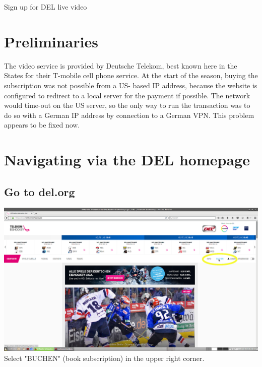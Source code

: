\documentclass[12pt]{article}
\begin{document}
\begin{center}
	\begin{Huge}
		Sign up for DEL live video
	\end{Huge}
\end{center}

\section{Preliminaries}
	The video service is provided by Deutsche Telekom, best known here in the States for their T-mobile
	cell phone service. At the start of the season, buying the subscription was not possible from a US-
	based IP address, because the website is configured to redirect to a local server for the payment
	if possible. The network would time-out on the US server, so the only way to run the transaction
	was to do so with a German IP address by connection to a German VPN. This problem appears to be
	fixed now.

\section{Navigating via the DEL homepage}
	\subsection{Go to del.org}
		\includegraphics[width=\textwidth]{01-del_homepage.png}
		Select "BUCHEN" (book subscription) in the upper right corner.
	
\end{document}
